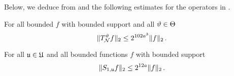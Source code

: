 Below, we deduce  from  and the following estimates for the operators in .

\begin{lemma}
    \label{nontangential-operator-bound}
    \leanok
    For all bounded $f$ with bounded support and all ${\vartheta} \in {\Theta}$
    $$
        \|T_{\mathcal{N}}^{{\vartheta}} f\|_2 \le 2^{102a^3} \|f\|_2\,.
    $$
\end{lemma}

\begin{lemma}
    \label{boundary-operator-bound}
    \leanok
    For all ${\mathfrak u} \in {\mathfrak U}$ and all bounded functions $f$ with bounded support
    \begin{equation}
        \label{eq-S-bound}
        \|S_{1,{\mathfrak u}}f\|_2 \le 2^{12a} \|f\|_2\,.
    \end{equation}
\end{lemma}

